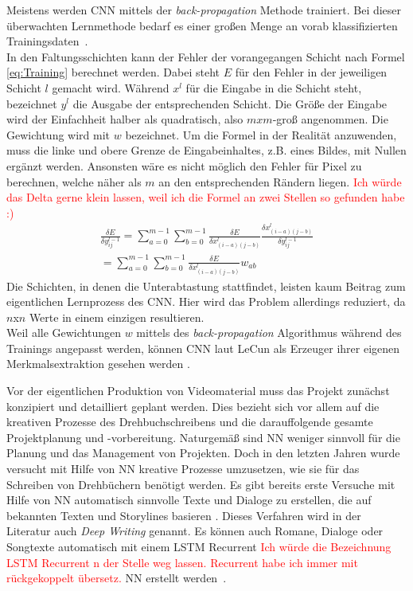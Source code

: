 \documentclass[times, 11pt,twocolumn]{article}
\begin{document}
 \label{sec:Training}
Meistens werden CNN mittels der \textit{back-propagation} Methode trainiert. Bei dieser überwachten Lernmethode bedarf es einer großen Menge an vorab klassifizierten Trainingsdaten~\cite{5537907}.  \\
In den Faltungsschichten kann der Fehler der vorangegangen Schicht nach Formel \ref{eq:Training} berechnet werden. Dabei steht $E$ für den Fehler in der jeweiligen Schicht $l$ gemacht wird. Während $x^l$ für die Eingabe in die Schicht steht, bezeichnet $y^l$ die Ausgabe der entsprechenden Schicht. Die Größe der Eingabe wird der Einfachheit halber als quadratisch, also $mxm$-groß angenommen. Die Gewichtung wird mit $w$ bezeichnet. Um die Formel in der Realität anzuwenden, muss die linke und obere Grenze de Eingabeinhaltes, z.B. eines Bildes, mit Nullen ergänzt werden. Ansonsten wäre es nicht möglich den Fehler für Pixel zu berechnen, welche näher als $m$ an den entsprechenden Rändern liegen. \textcolor{red}{Ich würde das Delta gerne klein lassen, weil ich die Formel an zwei Stellen so gefunden habe :)}\\
\footnotesize
\begin{equation}
\begin{aligned}
\frac{\delta E}{\delta y_{ij}^{l-1}} = \sum_{a=0}^{m-1} \sum_{b=0}^{m-1} \frac{\delta E}{\delta x_{(i-a)(j-b)}^{l}} \frac{\delta x_{(i-a)(j-b)}^{l}}{\delta y_{ij}^{l-1}}  \\
= \sum \limits_{a=0}^{m-1} \sum \limits_{b=0}^{m-1} \frac{\delta E}{\delta x_{(i-a)(j-b)}^{l}} w_{ab}
\end{aligned}
	\label{eq:Training}
\end{equation}
\small
Die Schichten, in denen die Unterabtastung stattfindet, leisten kaum Beitrag zum eigentlichen Lernprozess des CNN. Hier wird das Problem allerdings reduziert, da $n$x$n$ Werte in einem einzigen resultieren. \\
Weil alle Gewichtungen $w$ mittels des \textit{back-propagation} Algorithmus während des Trainings angepasst werden, können CNN laut LeCun als Erzeuger ihrer eigenen Merkmalsextraktion gesehen werden \cite{LeCun:1998:CNI:303568.303704}.


 \label{sec:Konzeption}
Vor der eigentlichen Produktion von Videomaterial muss das Projekt zunächst konzipiert und detailliert geplant werden. Dies bezieht sich vor allem auf die kreativen Prozesse des Drehbuchschreibens und die darauffolgende gesamte Projektplanung und -vorbereitung. Naturgemäß sind NN weniger sinnvoll für die Planung und das Management von Projekten. Doch in den letzten Jahren wurde versucht mit Hilfe von NN kreative Prozesse umzusetzen, wie sie für das Schreiben von Drehbüchern benötigt werden. Es gibt bereits erste Versuche mit Hilfe von NN automatisch sinnvolle Texte und Dialoge zu erstellen, die auf bekannten Texten und Storylines basieren \cite{Thoma16}. Dieses Verfahren wird in der Literatur auch \textit{Deep Writing} genannt. Es können auch Romane, Dialoge oder Songtexte automatisch mit einem LSTM Recurrent \textcolor{red}{Ich würde die Bezeichnung LSTM Recurrent n der Stelle weg lassen. Recurrent habe ich immer mit rückgekoppelt übersetz.} NN erstellt werden~\cite{DrehbuchWrite}.
\end{document}
